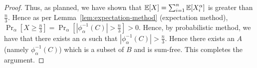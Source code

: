 \begin{proof}
Thus, as planned, we have shown that ${\mathbb E}[X] = \sum_{i=1}^n {\mathbb E}[X_i^{\alpha}]$ is greater than $\frac{n}{3}$. Hence as per Lemma~\ref{lem:expectation-method} (expectation method), $\Pr_{\alpha}[X \ge \frac{n}{3}] = \Pr_{\alpha}\left[|\phi_\alpha^{-1}(C)| > \frac{n}{3}\right] > 0$. Hence, by probabilistic method, we have that there exists an $\alpha$ such that $|\phi_\alpha^{-1}(C)| > \frac{n}{3}$. Hence there exists an $A$ (namely $\phi_\alpha^{-1}(C)$) which is a subset of $B$ and is sum-free. This completes the argument.
\end{proof}

